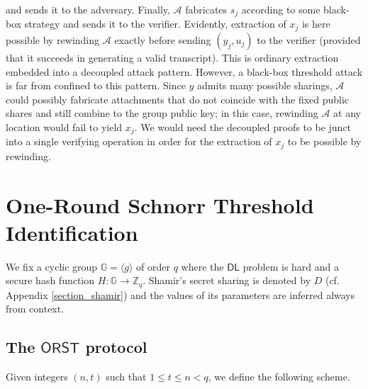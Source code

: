 \documentclass{iacrtrans}
\begin{document}
and sends it to the adversary.
Finally, $\mathcal{A}$ fabricates $s_j$
according to some black-box strategy
and sends it to the verifier.
Evidently, extraction of $x_j$ is here possible
by rewinding $\mathcal{A}$
exactly before sending $(y_j, u_j)$ to the verifier
(provided that it
succeeds in generating a valid transcript).
This is ordinary extraction
embedded into a decoupled attack pattern.
However, a black-box threshold attack
is far from confined to this pattern.
Since $y$ admits many possible sharings,
$\mathcal{A}$ could possibly fabricate attachments
that do not coincide with the fixed public shares
and still combine to the group public key;
in this case, rewinding $\mathcal{A}$ at any location
would fail to yield $x_j$.
We would need the decoupled proofs to
be junct into a single verifying operation
in order for the extraction of $x_j$
to be possible by rewinding.

\section{One-Round Schnorr Threshold Identification}\label{section_orst}

\noindent
We fix a cyclic group $\mathbb{G} = \langle g \rangle$ of order $q$
where the $\mathsf{DL}$ problem is hard and
a secure hash function $H: \mathbb{G} \rightarrow \mathbb{Z}_q$.
Shamir's secret sharing is denoted by $D$
(cf. Appendix \ref{section_shamir}) and the values
of its parameters are inferred always from context.

\subsection{The $\mathsf{ORST}$ protocol}

Given integers $(n, t)$ such that $1 \le t \le n < q$,
we define the following scheme.
\end{document}
